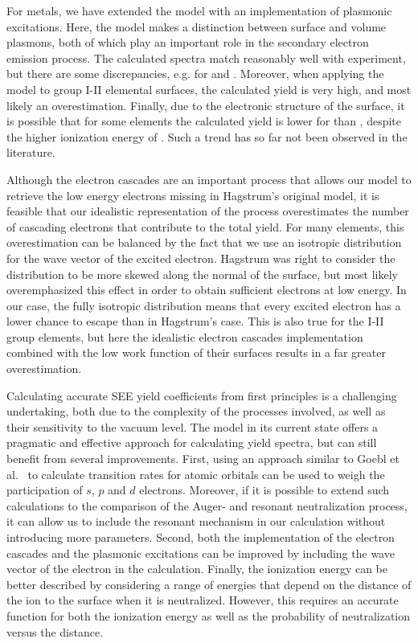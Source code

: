 \begin{refsection}
For metals, we have extended the model with an implementation of plasmonic 
excitations. Here, the model makes a distinction between surface and volume 
plasmons, both of which play an important role in the secondary electron emission 
process. The calculated spectra match reasonably well with experiment, but there 
are some discrepancies, e.g. for  and . Moreover, when applying the 
model to group I-II elemental surfaces, the calculated yield is very high, and 
most likely an overestimation. Finally, due to the electronic structure of the 
surface, it is possible that for some elements the calculated yield is lower 
for  than , despite the higher ionization energy of . Such 
a trend has so far not been observed in the literature.

Although the electron cascades are an important process that allows our model
to retrieve the low energy electrons missing in Hagstrum's original model, it 
is feasible that our idealistic representation of the process overestimates 
the number of cascading electrons that contribute to the total yield. For many 
elements, this overestimation can be balanced by the fact that we use an isotropic 
distribution for the wave vector of the excited electron. Hagstrum was right to
consider the distribution to be more skewed along the normal of the surface, but 
most likely overemphasized this effect in order to obtain sufficient electrons
at low energy. In our case, the fully isotropic distribution means that every 
excited electron has a lower chance to escape than in Hagstrum's case. This is
also true for the I-II group elements, but here the idealistic electron cascades 
implementation combined with the low work function of their surfaces 
results in a far greater overestimation.

Calculating accurate SEE yield coefficients from first principles is a 
challenging undertaking, both due to the complexity of the processes involved, 
as well as their sensitivity to the vacuum level. The model in its current state 
offers a pragmatic and effective approach for calculating yield spectra, but 
can still benefit from several improvements. First, using an approach similar to 
Goebl et al.~\cite{Goebl2011} to calculate transition rates for atomic orbitals 
can be used to weigh the participation of $s$, $p$ and $d$ electrons. Moreover, if 
it is possible to extend such calculations to the comparison of the Auger- and resonant
neutralization process, it can allow us to include the resonant mechanism in our 
calculation without introducing more parameters. Second, both 
the implementation of the electron cascades and the plasmonic excitations can be 
improved by including the wave vector of the electron in the 
calculation. Finally, the ionization energy can be better described by considering 
a range of energies that depend on the distance of the ion to the surface when it 
is neutralized. However, this requires an accurate function for both the ionization 
energy as well as the probability of neutralization versus the distance. 
 
\printbibliography 
\end{refsection} 

